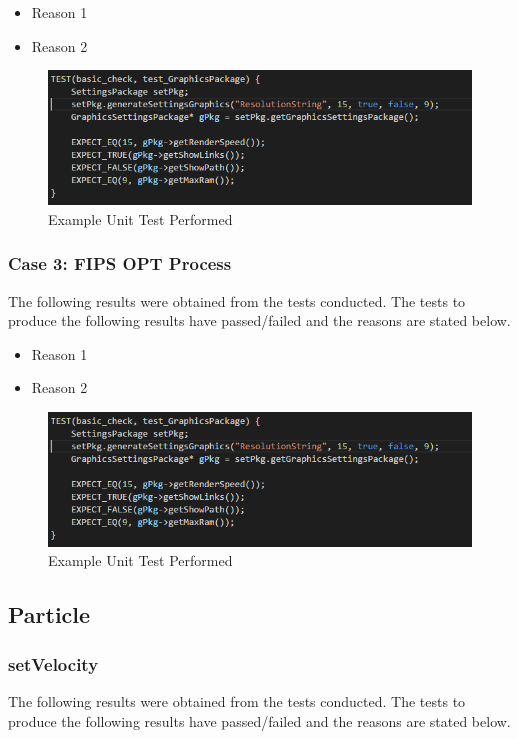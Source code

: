 \documentclass[11pt]{article}
\begin{document}
\begin{itemize}
	\item Reason 1
	\item Reason 2
\end{itemize}

\begin{figure}
\includegraphics[scale=0.5]{GTest.png}
\caption{Example Unit Test Performed}
\end{figure}

\subsubsection{Case 3: FIPS OPT Process}
The following results were obtained from the tests conducted. The tests to produce the
following results have passed/failed and the reasons are stated below.

\begin{itemize}
	\item Reason 1
	\item Reason 2
\end{itemize}
\begin{figure}
\includegraphics[scale=0.5]{GTest.png}
\caption{Example Unit Test Performed}
\end{figure}

\subsection{Particle}
\subsubsection{setVelocity}
The following results were obtained from the tests conducted. The tests to produce the
following results have passed/failed and the reasons are stated below.
\end{document}
